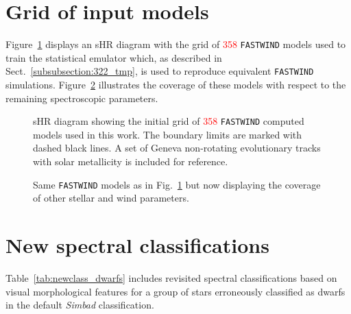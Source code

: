 \documentclass{aa}
\newcommand{\num}[1]{\textcolor{red}{#1}}
\begin{document}
\begin{appendix}




\section{Grid of input models}
\label{apen.input_maui}

Figure~\ref{fig:train_models} displays an sHR diagram with the grid of \num{358} {\tt FASTWIND} models used to train the statistical emulator which, as described in Sect.~\ref{subsubsection:322_tmp}, is used to reproduce equivalent {\tt FASTWIND} simulations. Figure~\ref{fig:train_models_others} illustrates the coverage of these models with respect to the remaining spectroscopic parameters. 

\begin{figure}[!h]
\centering
{}
\caption{sHR diagram showing the initial grid of \num{358} {\tt FASTWIND} computed models used in this work. The boundary limits are marked with dashed black lines. A set of Geneva non-rotating evolutionary tracks with solar metallicity is included for reference.}
\label{fig:train_models}
\end{figure}

\begin{figure}[!t]
\centering
{}
\caption{Same {\tt FASTWIND} models as in Fig.~\ref{fig:train_models} but now displaying the coverage of other stellar and wind parameters.}
\label{fig:train_models_others}
\end{figure}






\section{New spectral classifications}
\label{apen.dwarfs}

Table~\ref{tab:newclass_dwarfs} includes revisited spectral classifications based on visual morphological features for a group of stars erroneously classified as dwarfs in the default \textit{Simbad} classification.


\end{appendix}
\end{document}
